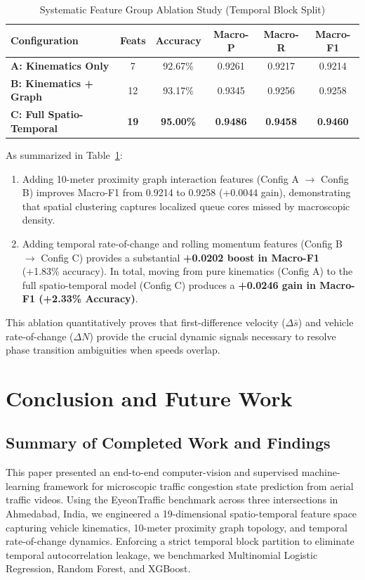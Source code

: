 \documentclass[conference]{IEEEtran}
\begin{document}
\begin{table}[htbp]
\caption{Systematic Feature Group Ablation Study (Temporal Block Split)}
\label{tab:ablation_results}
\centering
\begin{tabular}{lccccc}
\toprule
\textbf{Configuration} & \textbf{Feats} & \textbf{Accuracy} & \textbf{Macro-P} & \textbf{Macro-R} & \textbf{Macro-F1} \\
\midrule
\textbf{A: Kinematics Only}        & 7  & 92.67\% & 0.9261 & 0.9217 & 0.9214 \\
\textbf{B: Kinematics + Graph}    & 12 & 93.17\% & 0.9345 & 0.9256 & 0.9258 \\
\textbf{C: Full Spatio-Temporal}  & \textbf{19} & \textbf{95.00\%} & \textbf{0.9486} & \textbf{0.9458} & \textbf{0.9460} \\
\bottomrule
\end{tabular}
\end{table}

As summarized in Table~\ref{tab:ablation_results}:
\begin{enumerate}
    \item Adding 10-meter proximity graph interaction features (Config A $\to$ Config B) improves Macro-F1 from 0.9214 to 0.9258 (+0.0044 gain), demonstrating that spatial clustering captures localized queue cores missed by macroscopic density.
    \item Adding temporal rate-of-change and rolling momentum features (Config B $\to$ Config C) provides a substantial \textbf{+0.0202 boost in Macro-F1} (+1.83\% accuracy). In total, moving from pure kinematics (Config A) to the full spatio-temporal model (Config C) produces a \textbf{+0.0246 gain in Macro-F1 (+2.33\% Accuracy)}.
\end{enumerate}
This ablation quantitatively proves that first-difference velocity ($\Delta \bar{s}$) and vehicle rate-of-change ($\Delta N$) provide the crucial dynamic signals necessary to resolve phase transition ambiguities when speeds overlap.

\section{Conclusion and Future Work}

\subsection{Summary of Completed Work and Findings}
This paper presented an end-to-end computer-vision and supervised machine-learning framework for microscopic traffic congestion state prediction from aerial traffic videos. Using the EyeonTraffic benchmark across three intersections in Ahmedabad, India, we engineered a 19-dimensional spatio-temporal feature space capturing vehicle kinematics, 10-meter proximity graph topology, and temporal rate-of-change dynamics. Enforcing a strict temporal block partition to eliminate temporal autocorrelation leakage, we benchmarked Multinomial Logistic Regression, Random Forest, and XGBoost.
\end{document}
